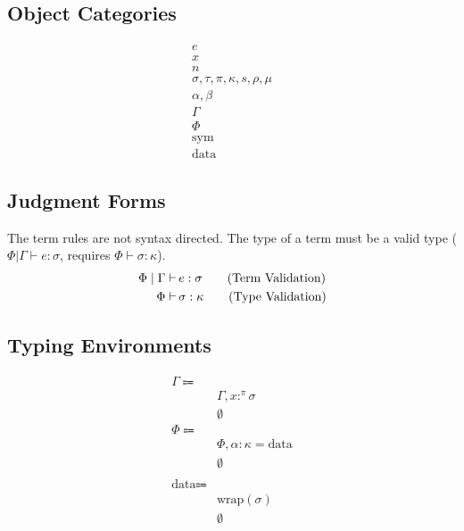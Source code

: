 \documentclass {article}
\begin{document}
\subsection{Object Categories}

\begin{align*}
e \tag{Terms} \\
x \tag{Variables} \\
n \tag{Numbers} \\
\sigma, \tau, \pi, \kappa, s, \rho, \mu \tag{Types} \\
\alpha, \beta \tag{Type Variables} \\
\Gamma \tag{Type Environment} \\
\Phi \tag{Misc Environment} \\
\text{sym} \tag{Symbol} \\
\text{data} \tag{NewType}
\end{align*}


\subsection{Judgment Forms}
The term rules are not syntax directed.
The type of a term must be a valid type ($ \Phi | \Gamma \vdash e : \sigma $, requires $ \Phi \vdash \sigma : \kappa $).
\begin{align*}
\Phi \mid \Gamma \vdash \, & e : \sigma \tag{\text{Term Validation}} \\
\Phi \vdash \, & \sigma : \kappa \tag{\text{Type Validation}} \\
\end{align*}

\subsection{Typing Environments}
\begin{align*}
\Gamma \Coloneqq & \\
& \Gamma, x :^\pi \sigma \\
& \emptyset \\
\Phi \Coloneqq & \\
& \Phi, \alpha : \kappa = \text{data} \\
& \emptyset \\
\\
\text{data} \Coloneqq & \\
& \text{wrap} (\sigma) \\
& \emptyset
\end{align*} \\
\end{document}
